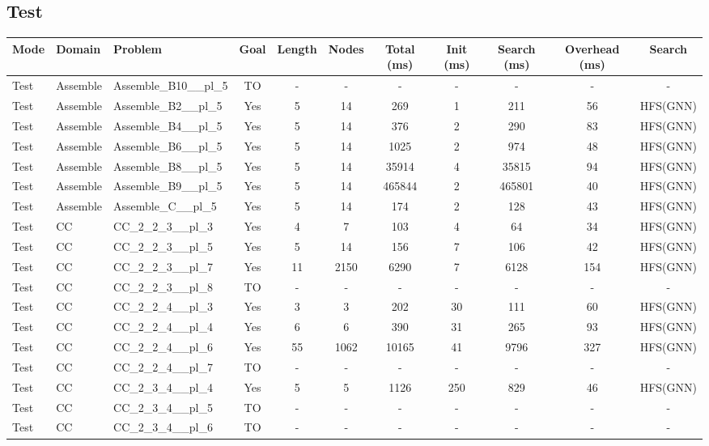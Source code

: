 \documentclass{article}
\begin{document}
\subsection*{Test}
\begin{tabular}{lllcccccccc}
\toprule
Mode & Domain & Problem & Goal & Length & Nodes & Total (ms) & Init (ms) & Search (ms) & Overhead (ms) & Search \\
\midrule
Test & Assemble & Assemble\_B10\_\_pl\_5 & TO & - & - & - & - & - & - & - \\
Test & Assemble & Assemble\_B2\_\_pl\_5 & Yes & 5 & 14 & 269 & 1 & 211 & 56 & HFS(GNN) \\
Test & Assemble & Assemble\_B4\_\_pl\_5 & Yes & 5 & 14 & 376 & 2 & 290 & 83 & HFS(GNN) \\
Test & Assemble & Assemble\_B6\_\_pl\_5 & Yes & 5 & 14 & 1025 & 2 & 974 & 48 & HFS(GNN) \\
Test & Assemble & Assemble\_B8\_\_pl\_5 & Yes & 5 & 14 & 35914 & 4 & 35815 & 94 & HFS(GNN) \\
Test & Assemble & Assemble\_B9\_\_pl\_5 & Yes & 5 & 14 & 465844 & 2 & 465801 & 40 & HFS(GNN) \\
Test & Assemble & Assemble\_C\_\_pl\_5 & Yes & 5 & 14 & 174 & 2 & 128 & 43 & HFS(GNN) \\
Test & CC & CC\_2\_2\_3\_\_pl\_3 & Yes & 4 & 7 & 103 & 4 & 64 & 34 & HFS(GNN) \\
Test & CC & CC\_2\_2\_3\_\_pl\_5 & Yes & 5 & 14 & 156 & 7 & 106 & 42 & HFS(GNN) \\
Test & CC & CC\_2\_2\_3\_\_pl\_7 & Yes & 11 & 2150 & 6290 & 7 & 6128 & 154 & HFS(GNN) \\
Test & CC & CC\_2\_2\_3\_\_pl\_8 & TO & - & - & - & - & - & - & - \\
Test & CC & CC\_2\_2\_4\_\_pl\_3 & Yes & 3 & 3 & 202 & 30 & 111 & 60 & HFS(GNN) \\
Test & CC & CC\_2\_2\_4\_\_pl\_4 & Yes & 6 & 6 & 390 & 31 & 265 & 93 & HFS(GNN) \\
Test & CC & CC\_2\_2\_4\_\_pl\_6 & Yes & 55 & 1062 & 10165 & 41 & 9796 & 327 & HFS(GNN) \\
Test & CC & CC\_2\_2\_4\_\_pl\_7 & TO & - & - & - & - & - & - & - \\
Test & CC & CC\_2\_3\_4\_\_pl\_4 & Yes & 5 & 5 & 1126 & 250 & 829 & 46 & HFS(GNN) \\
Test & CC & CC\_2\_3\_4\_\_pl\_5 & TO & - & - & - & - & - & - & - \\
Test & CC & CC\_2\_3\_4\_\_pl\_6 & TO & - & - & - & - & - & - & - \\

\end{tabular}
\end{document}

